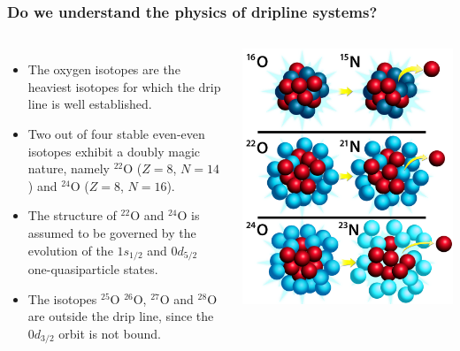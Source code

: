 \documentclass[compress]{beamer}
\begin{document}
\frame
    {
      \frametitle{Do we understand the physics of dripline systems?}
      \begin{footnotesize}
     \begin{columns}
      \column{5.0cm}
\begin{itemize}
\item The oxygen isotopes are the heaviest isotopes for
which the drip line is well established.
\item Two out of four
stable even-even isotopes exhibit a doubly magic nature,
namely $^{22}$O ($Z=8$, $N=14$) and $^{24}$O ($Z=8$, $N=16$).
\item 
The structure of $^{22}$O and $^{24}$O is assumed to be governed
by the evolution of the $1s_{1/2}$ and $0d_{5/2}$  one-quasiparticle states.
\item The isotopes
$^{25}$O
$^{26}$O, $^{27}$O and $^{28}$O are outside the drip line, since the $0d_{3/2}$ orbit is not bound.
\end{itemize}
\column{5cm}
      \begin{center}
	\includegraphics[width=1.2\textwidth]{oxygens.jpg}
      \end{center}
\end{columns}
      \end{footnotesize}
    }
\end{document}
